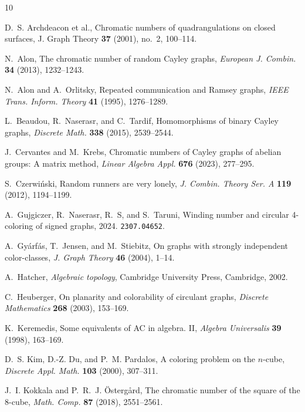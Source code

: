 \documentclass[12pt,letterpaper]{amsart}
\theoremstyle{definition}
\theoremstyle{remark}
\begin{document}
\begin{thebibliography}{10}
\providecommand{\url}[1]{\texttt{#1}}
\providecommand{\urlprefix}{URL }
\providecommand{\eprint}[2][]{\url{#2}}

 D.~S. Archdeacon et al., Chromatic numbers of quadrangulations on closed surfaces, J. Graph Theory {\bf 37} (2001), no.~2, 100--114.

N.~Alon, The chromatic number of random {C}ayley graphs, \emph{European J.
  Combin.} \textbf{34} (2013), 1232--1243.

N.~Alon and A.~Orlitsky, Repeated communication and {R}amsey graphs, \emph{IEEE
  Trans. Inform. Theory} \textbf{41} (1995), 1276--1289.

L.~Beaudou, R.~Naserasr, and C.~Tardif, Homomorphisms of binary {C}ayley
  graphs, \emph{Discrete Math.} \textbf{338} (2015), 2539--2544.

J.~Cervantes and M.~Krebs, Chromatic numbers of {C}ayley graphs of abelian
  groups: {A} matrix method, \emph{Linear Algebra Appl.} \textbf{676} (2023),
  277--295.

S.~Czerwi\'nski, Random runners are very lonely, \emph{J. Combin. Theory Ser.
  A} \textbf{119} (2012), 1194--1199.

A.~Gujgiczer, R.~Naserasr, R.~S, and S.~Taruni, Winding number and circular
  4-coloring of signed graphs, 2024. \eprint{2307.04652}.

A.~Gy\'arf\'as, T.~Jensen, and M.~Stiebitz, On graphs with strongly independent
  color-classes, \emph{J. Graph Theory} \textbf{46} (2004), 1--14.

A.~Hatcher, \emph{Algebraic topology}, Cambridge University Press, Cambridge,
  2002.

C.~Heuberger, On planarity and colorability of circulant graphs, \emph{Discrete
  Mathematics} \textbf{268} (2003), 153--169.

K.~Keremedis, Some equivalents of {AC} in algebra. {II}, \emph{Algebra
  Universalis} \textbf{39} (1998), 163--169.

D.~S. Kim, D.-Z. Du, and P.~M. Pardalos, A coloring problem on the {$n$}-cube,
  \emph{Discrete Appl. Math.} \textbf{103} (2000), 307--311.

J.~I. Kokkala and P.~R.~J. \"{O}sterg\aa rd, The chromatic number of the square
  of the 8-cube, \emph{Math. Comp.} \textbf{87} (2018), 2551--2561.


\end{thebibliography}
\end{document}
